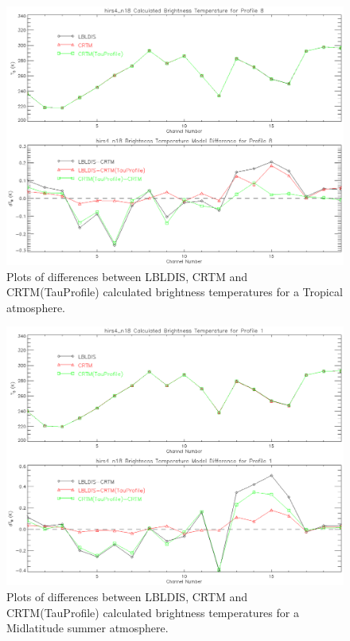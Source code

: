 \begin{figure}[htp]
  \centering{}
  \includegraphics[scale=0.8]{./graphics/Clear_Sky_Comparison_08.eps}
  \caption{Plots of differences between LBLDIS, CRTM and CRTM(TauProfile) calculated brightness temperatures for
   a Tropical atmosphere.}
  \label{fig:Clear_Sky_Tropical}
\end{figure}

\begin{figure}[htp]
  \centering{}
  \includegraphics[scale=0.8]{./graphics/Clear_Sky_Comparison_01.eps}
  \caption{Plots of differences between LBLDIS, CRTM and CRTM(TauProfile) calculated brightness temperatures for
   a Midlatitude summer atmosphere.}
  \label{fig:Clear_Sky_Midlatitude_summer}
\end{figure}

